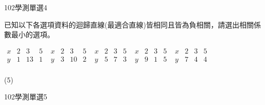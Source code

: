 \begin{QUESTIONS}
\begin{QUESTION}
\begin{ExamInfo}{102}{學測}{單選}{4}
        \end{ExamInfo}
        \begin{ExamAnsRateInfo}{30}{46}{25}{19}
        \end{ExamAnsRateInfo}
        \begin{QBODY}
			已知以下各選項資料的迴歸直線(最適合直線)皆相同且皆為負相關，請選出相關係數最小的選項。
			\begin{QOPS}
				\QOP $\begin{matrix}
				   x & 2 & 3 & 5  \\
				   y & 1 & 13 & 1  \\
				\end{matrix}$	
				\QOP $\begin{matrix}
				   x & 2 & 3 & 5  \\
				   y & 3 & 10 & 2  \\
				\end{matrix}$ 	
				\QOP $\begin{matrix}
				   x & 2 & 3 & 5  \\
				   y & 5 & 7 & 3  \\
				\end{matrix}$ 
				\QOP $\begin{matrix}
				   x & 2 & 3 & 5  \\
				   y & 9 & 1 & 5  \\
				\end{matrix}$	
				\QOP $\begin{matrix}
				   x & 2 & 3 & 5  \\
				   y & 7 & 4 & 4  \\
				\end{matrix}$
			\end{QOPS}
        \end{QBODY}
        \begin{QFROMS}
        \end{QFROMS}
        \begin{QTAGS}\end{QTAGS}
        \begin{QANS}
            (5)
        \end{QANS}
        \begin{QSOLLIST}
        \end{QSOLLIST}
        \begin{QEMPTYSPACE}
        \end{QEMPTYSPACE}
    \end{QUESTION}
    \begin{QUESTION}
        \begin{ExamInfo}{102}{學測}{單選}{5}

\end{ExamInfo}
\end{QUESTION}
\end{QUESTIONS}
